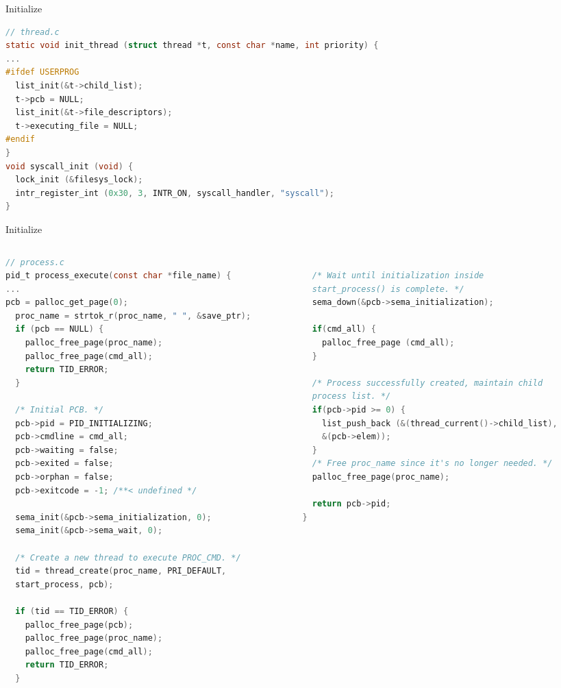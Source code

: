 \documentclass[10pt]{beamer}
\begin{document}
\begin{frame}[fragile]{Initialize}
    \begin{lstlisting}[language=C]
// thread.c
static void init_thread (struct thread *t, const char *name, int priority) {
...
#ifdef USERPROG
  list_init(&t->child_list);
  t->pcb = NULL;
  list_init(&t->file_descriptors);
  t->executing_file = NULL;
#endif
}
void syscall_init (void) {
  lock_init (&filesys_lock);
  intr_register_int (0x30, 3, INTR_ON, syscall_handler, "syscall");
}
\end{lstlisting}
\end{frame}
\begin{frame}[fragile]{Initialize}
\begin{columns}
\begin{column}{0.5\textwidth}
\begin{lstlisting}[language=C]
// process.c
pid_t process_execute(const char *file_name) {
...
pcb = palloc_get_page(0);
  proc_name = strtok_r(proc_name, " ", &save_ptr);
  if (pcb == NULL) {
    palloc_free_page(proc_name);
    palloc_free_page(cmd_all);
    return TID_ERROR;
  }
  
  /* Initial PCB. */
  pcb->pid = PID_INITIALIZING;
  pcb->cmdline = cmd_all;
  pcb->waiting = false;
  pcb->exited = false;
  pcb->orphan = false;
  pcb->exitcode = -1; /**< undefined */ 

  sema_init(&pcb->sema_initialization, 0);
  sema_init(&pcb->sema_wait, 0);

  /* Create a new thread to execute PROC_CMD. */
  tid = thread_create(proc_name, PRI_DEFAULT, 
  start_process, pcb);

  if (tid == TID_ERROR) {
    palloc_free_page(pcb);
    palloc_free_page(proc_name);
    palloc_free_page(cmd_all);
    return TID_ERROR;
  }
\end{lstlisting}
\end{column}
\begin{column}{0.5\textwidth}
\begin{lstlisting}[language=C]

  /* Wait until initialization inside 
  start_process() is complete. */
  sema_down(&pcb->sema_initialization);
  
  if(cmd_all) {
    palloc_free_page (cmd_all);
  }

  /* Process successfully created, maintain child 
  process list. */
  if(pcb->pid >= 0) {
    list_push_back (&(thread_current()->child_list),
    &(pcb->elem));
  }  
  /* Free proc_name since it's no longer needed. */
  palloc_free_page(proc_name);
  
  return pcb->pid;
}
\end{lstlisting}
\end{column}
\end{columns}
\end{frame}
\end{document}
